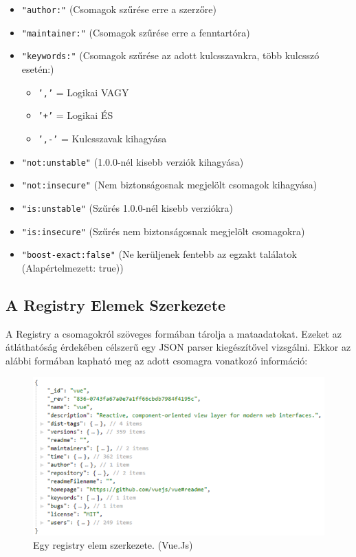 \begin{itemize}
	\item \texttt{"author:"} (Csomagok szűrése erre a szerzőre)
	\item \texttt{"maintainer:"} (Csomagok szűrése erre a fenntartóra)
	\item \texttt{"keywords:"} (Csomagok szűrése az adott kulcsszavakra, több kulcsszó esetén:)
	\begin{itemize}
		\item \texttt{','} = Logikai VAGY
		\item \texttt{'+'} = Logikai ÉS
		\item \texttt{',-'} = Kulcsszavak kihagyása
	\end{itemize}
	\item \texttt{"not:unstable"} (1.0.0-nél kisebb verziók kihagyása)
	\item \texttt{"not:insecure"} (Nem biztonságosnak megjelölt csomagok kihagyása)
	\item \texttt{"is:unstable"} (Szűrés 1.0.0-nél kisebb verziókra)
	\item \texttt{"is:insecure"} (Szűrés nem biztonságosnak megjelölt csomagokra)
	\item \texttt{"boost-exact:false"} (Ne kerüljenek fentebb az egzakt találatok (Alapértelmezett: true))
\end{itemize}

\begin{flushright}
	\cite{npm-registry-api}
\end{flushright}

\subsection{A Registry Elemek Szerkezete}

A Registry a csomagokról szöveges formában tárolja a mataadatokat. Ezeket az átláthatóság érdekében célszerű egy JSON parser kiegészítővel vizsgálni. Ekkor az alábbi formában kapható meg az adott csomagra vonatkozó információ:

\begin{figure}[h]
	\centering
	\includegraphics[scale=0.75]{images/registry_vue.png}
	\caption{Egy registry elem szerkezete. (Vue.Js)}
	\label{fig:registry-package}
\end{figure}

